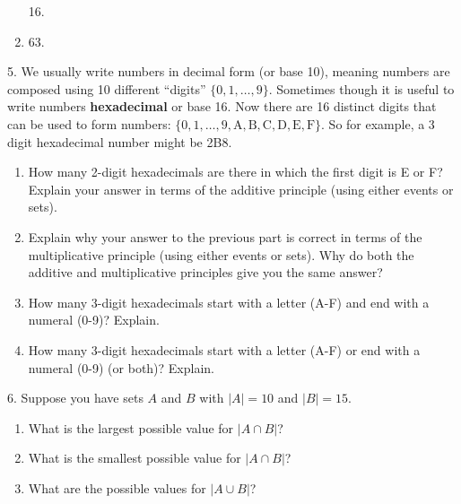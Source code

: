 \documentclass[12pt,]{book}
\newcommand{\terminology}[1]{\textbf{#1}}
\theoremstyle{plain}
\theoremstyle{definition}
\theoremstyle{definition}
\theoremstyle{definition}
\numberwithin{equation}{chapter}
\newcommand{\card}[1]{\left| #1 \right|}
\begin{document}
\begin{exerciselist}
\begin{enumerate}[label=(\alph*)]
16.%
\item\hypertarget{li-354}{}\hypertarget{p-787}{}%
63.%
\end{enumerate}
%
\par\smallskip
\item[5.]\hypertarget{exercise-92}{}\hypertarget{p-791}{}%
We usually write numbers in decimal form (or base 10), meaning numbers are composed using 10 different ``digits'' \(\{0,1,\ldots, 9\}\). Sometimes though it is useful to write numbers \terminology{hexadecimal} or base 16. Now there are 16 distinct digits that can be used to form numbers: \(\{0, 1, \ldots, 9, \mathrm{A, B, C, D, E, F}\}\). So for example, a 3 digit hexadecimal number might be 2B8. \leavevmode%
\begin{enumerate}[label=(\alph*)]
\item\hypertarget{li-357}{}\hypertarget{p-792}{}%
How many 2-digit hexadecimals are there in which the first digit is E or F? Explain your answer in terms of the additive principle (using either events or sets). %
\item\hypertarget{li-358}{}\hypertarget{p-793}{}%
Explain why your answer to the previous part is correct in terms of the multiplicative principle (using either events or sets). Why do both the additive and multiplicative principles give you the same answer? %
\item\hypertarget{li-359}{}\hypertarget{p-794}{}%
How many 3-digit hexadecimals start with a letter (A-F) and end with a numeral (0-9)? Explain. %
\item\hypertarget{li-360}{}\hypertarget{p-795}{}%
How many 3-digit hexadecimals start with a letter (A-F) or end with a numeral (0-9) (or both)? Explain. %
\end{enumerate}
%
\par\smallskip
\item[6.]\hypertarget{exercise-93}{}\hypertarget{p-796}{}%
Suppose you have sets \(A\) and \(B\) with \(\card{A} = 10\) and \(\card{B} = 15\). \leavevmode%
\begin{enumerate}[label=(\alph*)]
\item\hypertarget{li-361}{}What is the largest possible value for \(\card{A \cap B}\)?%
\item\hypertarget{li-362}{}What is the smallest possible value for \(\card{A \cap B}\)?%
\item\hypertarget{li-363}{}What are the possible values for \(\card{A \cup B}\)?%
\end{enumerate}
%
\par\smallskip

\end{exerciselist}
\end{document}
